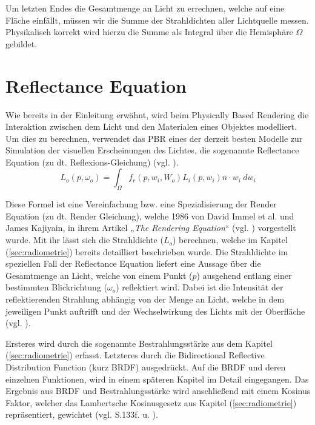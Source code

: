 \documentclass[
  11pt,
  a4paper,
  oneside
  ]{article}
\begin{document}
Um letzten Endes die Gesamtmenge an Licht zu errechnen, welche auf eine Fläche einfällt, müssen wir die Summe der Strahldichten aller Lichtquelle messen. Physikalisch korrekt wird hierzu die Summe als Integral über die Hemisphäre $\Omega$ gebildet. 
\section{Reflectance Equation}\label{sec:reflac}
Wie bereits in der Einleitung erwähnt, wird beim Physically Based Rendering die Interaktion zwischen dem Licht und den Materialen eines Objektes modelliert. Um dies zu berechnen, verwendet das PBR eines der derzeit besten Modelle zur Simulation der visuellen Erscheinungen des Lichtes, die sogenannte Reflectance Equation (zu dt. Reflexions-Gleichung) 
(vgl. \cite{learnOpenGL}). 
\begin{equation}
  L_{o}\left( p,\omega _{o}\right) =\int _{\Omega }f_{r}\left( p,w_{i},W_{o}\right)L_{i}\left( p,w_{i}\right)n\cdot w_{i} \ dw_{i}
\end{equation}

Diese Formel ist eine Vereinfachung bzw. eine Spezialisierung der Render Equation (zu dt. Render Gleichung), welche 1986 von David Immel et al. und James Kajiyain, in ihrem Artikel „\textit{The Rendering Equation}“ (vgl. \cite{theRenderingEquation}) vorgestellt wurde. Mit ihr lässt sich die Strahldichte ($L_{o}$) berechnen, welche im Kapitel (\ref{sec:radiometrie}) bereits detailliert beschrieben wurde. Die Strahldichte im speziellen Fall der Reflectance Equation liefert eine Aussage über die Gesamtmenge an Licht, welche von einem Punkt ($p$) ausgehend entlang einer bestimmten Blickrichtung ($\omega_{o}$) reflektiert wird. Dabei ist die Intensität der reflektierenden Strahlung abhängig von der Menge an Licht, welche in dem jeweiligen Punkt auftrifft und der Wechselwirkung des Lichts mit der Oberfläche (vgl. \cite{learnOpenGL}). 

Ersteres wird durch die sogenannte Bestrahlungsstärke aus dem Kapitel (\ref{sec:radiometrie}) erfasst. Letzteres durch die Bidirectional Reflective Distribution Function (kurz BRDF) ausgedrückt. Auf die BRDF und deren einzelnen Funktionen, wird in einem späteren Kapitel im Detail eingegangen. Das Ergebnis aus BRDF und Bestrahlungsstärke wird anschließend mit einem Kosinus Faktor, welcher das Lambertsche Kosinusgesetz aus Kapitel (\ref{sec:radiometrie}) repräsentiert, gewichtet 
(vgl. S.133f. \cite{openGlWolf} u. \cite{learnOpenGL}).
\end{document}
